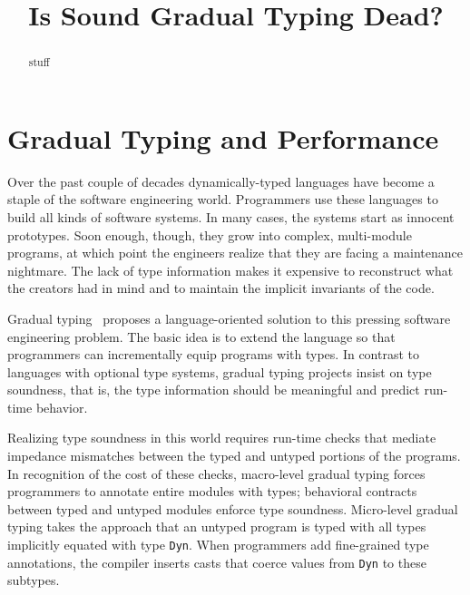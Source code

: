 \documentclass[preprint,10pt,english]{sigplanconf}
\title{Is Sound Gradual Typing Dead?}
\begin{document}
\setlength{\pdfpageheight}{\paperheight}
\setlength{\pdfpagewidth}{\paperwidth}


\maketitle

\begin{abstract}
stuff 
\end{abstract}

\section{Gradual Typing and Performance}

Over the past couple of decades dynamically-typed languages have become a
 staple of the software engineering world. Programmers use these languages
 to build all kinds of software systems. In many cases, the systems start
 as innocent prototypes. Soon enough, though, they grow into complex,
 multi-module programs, at which point the engineers realize that they are
 facing a maintenance nightmare. The lack of type information makes it
 expensive to reconstruct what the creators had in mind and to maintain the
 implicit invariants of the code. 

Gradual typing~\cite{st:gradual06,thf:dls06} proposes a language-oriented
 solution to this pressing software engineering problem. The basic idea is
 to extend the language so that programmers can incrementally equip
 programs with types. In contrast to languages with optional type systems,
 gradual typing projects insist on type soundness, that is, the type
 information should be meaningful and predict run-time behavior. 

Realizing type soundness in this world requires run-time checks that
 mediate impedance mismatches between the typed and untyped portions of the
 programs. In recognition of the cost of these checks, macro-level gradual
 typing forces programmers to annotate entire modules with types;
 behavioral contracts~\cite{ff:ho-contracts} between typed and untyped
 modules enforce type soundness. Micro-level gradual typing takes the
 approach that an untyped program is typed with all types implicitly
 equated with type {\tt Dyn}. When programmers add fine-grained type
 annotations, the compiler inserts casts that coerce values from {\tt Dyn}
 to these subtypes.
\end{document}

